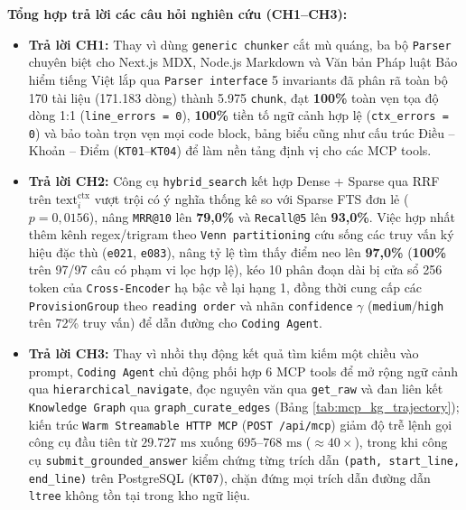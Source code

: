 \noindent\textbf{Tổng hợp trả lời các câu hỏi nghiên cứu (CH1--CH3):}
\begin{itemize}
    \item \textbf{Trả lời CH1:} Thay vì dùng \texttt{generic chunker} cắt mù quáng, ba bộ \texttt{Parser} chuyên biệt cho Next.js MDX, Node.js Markdown và Văn bản Pháp luật Bảo hiểm tiếng Việt lắp qua \texttt{Parser interface} 5 invariants đã phân rã toàn bộ 170 tài liệu (171.183 dòng) thành 5.975 \texttt{chunk}, đạt \textbf{100\%} toàn vẹn tọa độ dòng 1:1 (\texttt{line\_errors = 0}), \textbf{100\%} tiền tố ngữ cảnh hợp lệ (\texttt{ctx\_errors = 0}) và bảo toàn trọn vẹn mọi code block, bảng biểu cũng như cấu trúc Điều -- Khoản -- Điểm (\texttt{KT01}--\texttt{KT04}) để làm nền tảng định vị cho các MCP tools.
    \item \textbf{Trả lời CH2:} Công cụ \texttt{hybrid\_\allowbreak search} kết hợp Dense + Sparse qua RRF trên $\text{text}^{\text{ctx}}_i$ vượt trội có ý nghĩa thống kê so với Sparse FTS đơn lẻ ($p = 0,0156$), nâng \texttt{MRR@10} lên \textbf{79,0\%} và \texttt{Recall@5} lên \textbf{93,0\%}. Việc hợp nhất thêm kênh regex/trigram theo \texttt{Venn partitioning} cứu sống các truy vấn ký hiệu đặc thù (\texttt{e021}, \texttt{e083}), nâng tỷ lệ tìm thấy điểm neo lên \textbf{97,0\%} (\textbf{100\%} trên 97/97 câu có phạm vi lọc hợp lệ), kéo 10 phân đoạn dài bị cửa sổ 256 token của \texttt{Cross-Encoder} hạ bậc về lại hạng 1, đồng thời cung cấp các \texttt{Provision\allowbreak Group} theo \texttt{reading order} và nhãn \texttt{confidence} $\gamma$ (\texttt{medium}/\texttt{high} trên 72\% truy vấn) để dẫn đường cho \texttt{Coding Agent}.
    \item \textbf{Trả lời CH3:} Thay vì nhồi thụ động kết quả tìm kiếm một chiều vào prompt, \texttt{Coding Agent} chủ động phối hợp 6 MCP tools để mở rộng ngữ cảnh qua \texttt{hierarchical\_\allowbreak navigate}, đọc nguyên văn qua \texttt{get\_\allowbreak raw} và đan liên kết \texttt{Knowledge Graph} qua \texttt{graph\_\allowbreak curate\_\allowbreak edges} (Bảng \ref{tab:mcp_kg_trajectory}); kiến trúc \texttt{Warm Streamable HTTP MCP} (\texttt{POST /api/mcp}) giảm độ trễ lệnh gọi công cụ đầu tiên từ $29.727\text{ ms}$ xuống $695\text{--}768\text{ ms}$ ($\approx 40\times$), trong khi công cụ \texttt{submit\_\allowbreak grounded\_\allowbreak answer} kiểm chứng từng trích dẫn \texttt{(path, \allowbreak start\_line, \allowbreak end\_line)} trên PostgreSQL (\texttt{KT07}), chặn đứng mọi trích dẫn đường dẫn \texttt{ltree} không tồn tại trong kho ngữ liệu.
\end{itemize}
